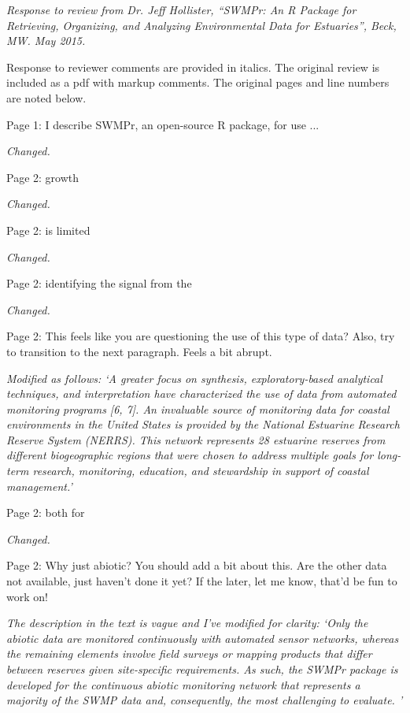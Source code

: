 \documentclass[letterpaper,12pt]{article}\usepackage[]{graphicx}\usepackage[]{color}
\begin{document}
\raggedright


{\it Response to review from Dr. Jeff Hollister, ``SWMPr: An R Package for Retrieving, Organizing, and Analyzing Environmental Data for Estuaries'', Beck, MW. May 2015.}

Response to reviewer comments are provided in italics.  The original review is included as a pdf with markup comments. The original pages and line numbers are noted below.

Page 1: I describe SWMPr, an open-source R package, for use ...

{\it Changed.}

Page 2: growth

{\it Changed.}

Page 2: is limited

{\it Changed.}

Page 2: identifying the signal from the

{\it Changed.}

Page 2: This feels like you are questioning the use of this type of data? Also, try to transition to the next paragraph. Feels a bit abrupt.

{\it Modified as follows: `A greater focus on synthesis, exploratory-based analytical techniques, and interpretation have characterized the use of data from automated monitoring programs [6, 7].  An invaluable source of monitoring data for coastal environments in the United States is provided by the National Estuarine Research Reserve System (NERRS). This network represents 28 estuarine reserves from different biogeographic regions that were chosen to address multiple goals for long-term research, monitoring, education, and stewardship in support of coastal management.'}

Page 2: both for

{\it Changed.}

Page 2: Why just abiotic? You should add a bit about this. Are the other data not available, just haven't done it yet? If the later, let me know, that'd be fun to work on!

{\it The description in the text is vague and I've modified for clarity: `Only the abiotic data are monitored continuously with automated sensor networks, whereas the remaining elements involve field surveys or mapping products that differ between reserves given site-specific requirements.  As such, the SWMPr package is developed for the continuous abiotic monitoring network that represents a majority of the SWMP data and, consequently, the most challenging to evaluate.  '}
\end{document}
